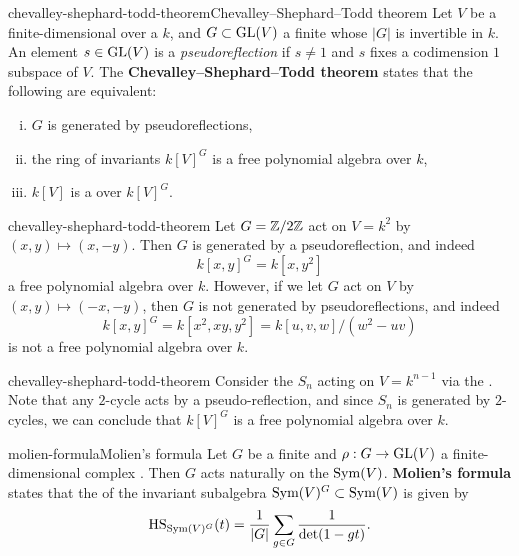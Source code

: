 \begin{topic}{chevalley-shephard-todd-theorem}{Chevalley--Shephard--Todd theorem}
    Let $V$ be a finite-dimensional  over a  $k$, and $G \subset \textup{GL}(V)$ a finite  whose  $|G|$ is invertible in $k$. An element $s \in \textup{GL}(V)$ is a \textit{pseudoreflection} if $s \ne 1$ and $s$ fixes a codimension $1$ subspace of $V$. The \textbf{Chevalley--Shephard--Todd theorem} states that the following are equivalent:
    \begin{enumerate}[(i)]
        \item $G$ is generated by pseudoreflections,
        \item the ring of invariants $k[V]^G$ is a free polynomial algebra over $k$,
        \item $k[V]$ is a  over $k[V]^G$.
    \end{enumerate}
\end{topic}

\begin{example}{chevalley-shephard-todd-theorem}
    Let $G = \mathbb{Z}/2\mathbb{Z}$ act on $V = k^2$ by $(x, y) \mapsto (x, -y)$. Then $G$ is generated by a pseudoreflection, and indeed
    \[ k[x, y]^G = k[x, y^2] \]
    a free polynomial algebra over $k$. However, if we let $G$ act on $V$ by $(x, y) \mapsto (-x, -y)$, then $G$ is not generated by pseudoreflections, and indeed
    \[ k[x, y]^G = k[x^2, xy, y^2] = k[u, v, w] / (w^2 - uv) \]
    is not a free polynomial algebra over $k$.
\end{example}

\begin{example}{chevalley-shephard-todd-theorem}
    Consider the  $S_n$ acting on $V = k^{n - 1}$ via the . Note that any $2$-cycle acts by a pseudo-reflection, and since $S_n$ is generated by $2$-cycles, we can conclude that $k[V]^G$ is a free polynomial algebra over $k$.
\end{example}

\begin{topic}{molien-formula}{Molien's formula}
    Let $G$ be a finite  and $\rho : G \to \textup{GL}(V)$ a finite-dimensional complex . Then $G$ acts naturally on the  $\textup{Sym}(V)$. \textbf{Molien's formula} states that the  of the invariant subalgebra $\textup{Sym}(V)^G \subset \textup{Sym}(V)$ is given by
    \[ \textup{HS}_{\textup{Sym}(V)^G}(t) = \frac{1}{|G|} \sum_{g \in G} \frac{1}{\det(1 - gt)} . \]
\end{topic}

